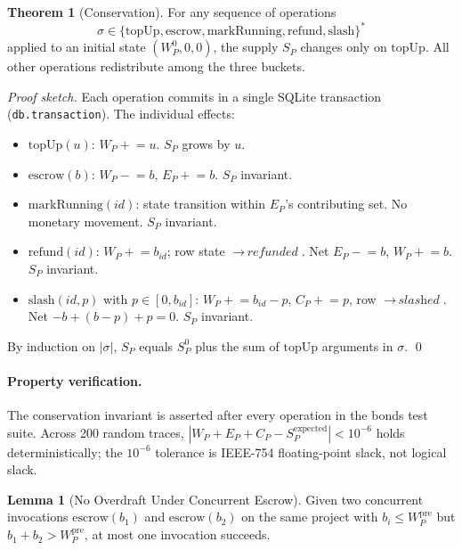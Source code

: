 \documentclass[11pt,a4paper]{article}
\theoremstyle{definition}
\newtheorem{theorem}{Theorem}[section]
\newtheorem{lemma}{Lemma}[section]
\theoremstyle{remark}
\begin{document}
\begin{theorem}[Conservation]\label{thm:conservation}
For any sequence of operations
\[
\sigma \in \bigl\{\mathrm{topUp},\mathrm{escrow},\mathrm{markRunning},
\mathrm{refund},\mathrm{slash}\bigr\}^{*}
\]
applied to an initial state $(W_P^{0}, 0, 0)$, the supply $S_P$ changes only on $\mathrm{topUp}$. All other operations redistribute among the three buckets.
\end{theorem}

\begin{proof}[Proof sketch]
Each operation commits in a single SQLite transaction (\texttt{db.transaction}). The individual effects:
\begin{itemize}[nosep]
  \item $\mathrm{topUp}(u)$: $W_P\mathrel{+}=u$. $S_P$ grows by $u$.
  \item $\mathrm{escrow}(b)$: $W_P\mathrel{-}=b$, $E_P\mathrel{+}=b$. $S_P$ invariant.
  \item $\mathrm{markRunning}(\mathit{id})$: state transition within $E_P$'s contributing set. No monetary movement. $S_P$ invariant.
  \item $\mathrm{refund}(\mathit{id})$: $W_P\mathrel{+}=b_{\mathit{id}}$; row state $\to\,\textit{refunded}$. Net $E_P\mathrel{-}=b$, $W_P\mathrel{+}=b$. $S_P$ invariant.
  \item $\mathrm{slash}(\mathit{id}, p)$ with $p\in[0, b_{\mathit{id}}]$: $W_P\mathrel{+}=b_{\mathit{id}}-p$, $C_P\mathrel{+}=p$, row $\to\,\textit{slashed}$. Net $-b + (b-p) + p = 0$. $S_P$ invariant.
\end{itemize}
By induction on $|\sigma|$, $S_P$ equals $S_P^{0}$ plus the sum of $\mathrm{topUp}$ arguments in $\sigma$. \qed
\end{proof}

\paragraph{Property verification.} The conservation invariant is asserted after every operation in the bonds test suite. Across 200 random traces, $|W_P + E_P + C_P - S_P^{\text{expected}}| < 10^{-6}$ holds deterministically; the $10^{-6}$ tolerance is IEEE-754 floating-point slack, not logical slack.

\begin{lemma}[No Overdraft Under Concurrent Escrow]\label{lem:no-overdraft}
Given two concurrent invocations $\mathrm{escrow}(b_1)$ and $\mathrm{escrow}(b_2)$ on the same project with $b_i \leq W_P^{\text{pre}}$ but $b_1 + b_2 > W_P^{\text{pre}}$, at most one invocation succeeds.
\end{lemma}
\end{document}
